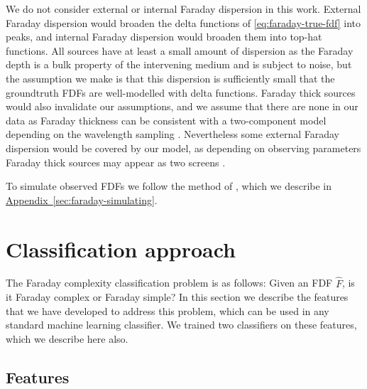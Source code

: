 \documentclass[11pt, a4paper]{book}
\newcommand{\aref}[1]{\hyperref[#1]{Appendix~\ref{#1}}}
\providecommand{\DIFaddbegin}{} %
\providecommand{\DIFaddend}{} %
\providecommand{\DIFdelbegin}{} %
\providecommand{\DIFdelend}{} %
\newcommand{\DIFscaledelfig}{0.5}
\newlength{\DIFdelgraphicswidth} %
\newlength{\DIFdelgraphicsheight} %
\newcommand{\DIFaddincludegraphics}[2][]{{\color{blue}\fbox{\DIFOincludegraphics[#1]{#2}}}} %
\newcommand{\DIFdelincludegraphics}[2][]{%
\sbox{\DIFdelgraphicsbox}{\DIFOincludegraphics[#1]{#2}}%
\settoboxwidth{\DIFdelgraphicswidth}{\DIFdelgraphicsbox} %
\settoboxtotalheight{\DIFdelgraphicsheight}{\DIFdelgraphicsbox} %
\scalebox{\DIFscaledelfig}{%
\parbox[b]{\DIFdelgraphicswidth}{\usebox{\DIFdelgraphicsbox}\\[-\baselineskip] \rule{\DIFdelgraphicswidth}{0em}}\llap{\resizebox{\DIFdelgraphicswidth}{\DIFdelgraphicsheight}{%
\setlength{\unitlength}{\DIFdelgraphicswidth}%
\begin{picture}(1,1)%
\thicklines\linethickness{2pt} %
{\color[rgb]{1,0,0}\put(0,0){\framebox(1,1){}}}%
{\color[rgb]{1,0,0}\put(0,0){\line( 1,1){1}}}%
{\color[rgb]{1,0,0}\put(0,1){\line(1,-1){1}}}%
\end{picture}%
}\hspace*{3pt}}} %
} %
\DeclareRobustCommand{\DIFaddbegin}{\DIFOaddbegin \let\includegraphics\DIFaddincludegraphics} %
\DeclareRobustCommand{\DIFaddend}{\DIFOaddend \let\includegraphics\DIFOincludegraphics} %
\DeclareRobustCommand{\DIFdelbegin}{\DIFOdelbegin \let\includegraphics\DIFdelincludegraphics} %
\DeclareRobustCommand{\DIFdelend}{\DIFOaddend \let\includegraphics\DIFOincludegraphics} %
\begin{document}
    We do not consider external or internal Faraday dispersion in this work. External Faraday dispersion would broaden the delta functions of \autoref{eq:faraday-true-fdf} into peaks, and internal Faraday dispersion would broaden them into top-hat functions. All sources have at least a small amount of dispersion as the Faraday depth is a bulk property of the intervening medium and is subject to noise, but the assumption we make is that this dispersion is sufficiently small that the groundtruth FDFs are well-modelled with delta functions. Faraday thick sources would also invalidate our assumptions, and we assume that there are none in our data as Faraday thickness can be consistent with a two-component model depending on the wavelength sampling \citep[e.g.][]{ma_broad-band_2019,brentjens_faraday_2005}. Nevertheless some external Faraday dispersion would be covered by our model, as depending on observing parameters Faraday thick sources may appear as two screens \citep{van_eck_faraday_2017}.

    To simulate observed FDFs we follow the method of \citet{brown_classifying_2018}, which we describe in \DIFdelbegin %
\DIFdelend \DIFaddbegin \aref{sec:faraday-simulating}\DIFaddend .

\section{Classification approach}
\label{sec:faraday-approach}

  The Faraday complexity classification problem is as follows: Given an FDF $\hat F$, is it Faraday complex or Faraday simple? In this section we describe the features that we have developed to address this problem, which can be used in any standard machine learning classifier. We trained two classifiers on these features, which we describe here also.

  \subsection{Features}
  \label{sec:faraday-scores-method}
\end{document}
